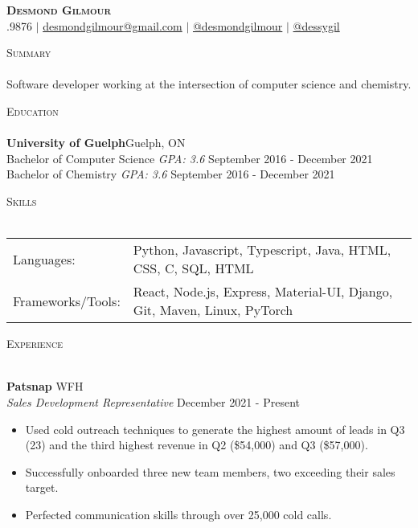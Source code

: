 \documentclass[a4paper]{article}
\newcommand{\lineunder} {
    \vspace*{-8pt} \\
    \hspace*{-18pt} \hrulefill \\
}
\newcommand{\header} [1] {
    {\hspace*{-18pt}\vspace*{6pt} \textsc{#1}}
    \vspace*{-6pt} \lineunder
}
\begin{document}
\vspace*{-40pt}

    

\vspace*{-10pt}
\begin{center}

	\textbf{{\Huge \scshape {Desmond Gilmour}}}\\
	\faPhone{}.9876 $|$ 
        \faEnvelope\space\href{mailto:desmondgilmour@gmail.com}{desmondgilmour@gmail.com} $|$  
        \faLinkedinSquare\space\href{https://www.linkedin.com/in/desmond-gilmour-886b3a128/}{@desmondgilmour} $|$
        \faGithubSquare\space\href{https://github.com/dessygil}{@dessygil}
        \\
\end{center}

\header {Summary}
Software developer working at the intersection of computer science and chemistry.

\header{Education}
\textbf{University of Guelph}\hfill Guelph, ON\\
Bachelor of Computer Science \textit{GPA: 3.6} \hfill September 2016 - December 2021\\
Bachelor of Chemistry  \textit{GPA: 3.6} \hfill September 2016 - December 2021\\
\vspace{2mm}

\header{Skills}
\begin{tabular}{ l l }
	Languages:        & Python, Javascript, Typescript, Java, HTML, CSS, C, SQL, HTML                      \\
	Frameworks/Tools: & React, Node.js, Express, Material-UI, Django, Git, Maven, Linux, PyTorch \\
\end{tabular}
\vspace{2mm}

\header{Experience}
\vspace{1mm}

\textbf{Patsnap} \hfill WFH\\
\textit{Sales Development Representative} \hfill December 2021 - Present\\
\vspace{-1mm}
\begin{itemize} \itemsep 1pt
	\item Used cold outreach techniques to generate the highest amount of leads in Q3 (23) and the third highest revenue in Q2 (\$54,000) and Q3 (\$57,000).
	\item Successfully onboarded three new team members, two exceeding their sales target.
	\item Perfected communication skills through over 25,000 cold calls.
\end{itemize}
\end{document}
